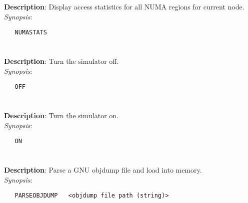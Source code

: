 \section{\quad{}}
\label{manpages:NUMASTATS}
\label{manpages:numastats}
\vspace{-0.1in}
{\bf Description}: 	Display access statistics for all NUMA regions for current node.\\[1.5ex]
{\em Synopsis}:
\vspace{-0.05in}
\scriptsize
\begin{lstlisting}
   NUMASTATS   																	
\end{lstlisting}
\normalsize
\vspace{-0.05in}


\section{\quad{}}
\label{manpages:OFF}
\label{manpages:off}
\vspace{-0.1in}
{\bf Description}: 	Turn the simulator off.\\[1.5ex]
{\em Synopsis}:
\vspace{-0.05in}
\scriptsize
\begin{lstlisting}
   OFF   											
\end{lstlisting}
\normalsize
\vspace{-0.05in}


\section{\quad{}}
\label{manpages:ON}
\label{manpages:on}
\vspace{-0.1in}
{\bf Description}: 	Turn the simulator on.\\[1.5ex]
{\em Synopsis}:
\vspace{-0.05in}
\scriptsize
\begin{lstlisting}
   ON   											
\end{lstlisting}
\normalsize
\vspace{-0.05in}


\section{\quad{}}
\label{manpages:PARSEOBJDUMP}
\label{manpages:parseobjdump}
\vspace{-0.1in}
{\bf Description}: 	Parse a GNU objdump file and load into memory.\\[1.5ex]
{\em Synopsis}:
\vspace{-0.05in}
\scriptsize
\begin{lstlisting}
   PARSEOBJDUMP   <objdump file path (string)>																
\end{lstlisting}
\normalsize
\vspace{-0.05in}


